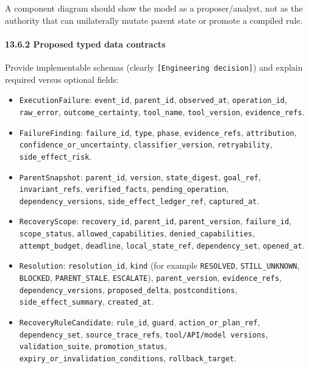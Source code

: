 A component diagram should show the model as a proposer/analyst, not as the authority that can unilaterally mutate parent state or promote a compiled rule.

\paragraph{13.6.2 Proposed typed data contracts}\label{1362-proposed-typed-data-contracts}

Provide implementable schemas (clearly \texttt{{[}Engineering\ decision{]}}) and explain required versus optional fields:

\begin{itemize}
\tightlist
\item
  \texttt{ExecutionFailure}: \texttt{event\_id}, \texttt{parent\_id}, \texttt{observed\_at}, \texttt{operation\_id}, \texttt{raw\_error}, \texttt{outcome\_certainty}, \texttt{tool\_name}, \texttt{tool\_version}, \texttt{evidence\_refs}.
\item
  \texttt{FailureFinding}: \texttt{failure\_id}, \texttt{type}, \texttt{phase}, \texttt{evidence\_refs}, \texttt{attribution}, \texttt{confidence\_or\_uncertainty}, \texttt{classifier\_version}, \texttt{retryability}, \texttt{side\_effect\_risk}.
\item
  \texttt{ParentSnapshot}: \texttt{parent\_id}, \texttt{version}, \texttt{state\_digest}, \texttt{goal\_ref}, \texttt{invariant\_refs}, \texttt{verified\_facts}, \texttt{pending\_operation}, \texttt{dependency\_versions}, \texttt{side\_effect\_ledger\_ref}, \texttt{captured\_at}.
\item
  \texttt{RecoveryScope}: \texttt{recovery\_id}, \texttt{parent\_id}, \texttt{parent\_version}, \texttt{failure\_id}, \texttt{scope\_status}, \texttt{allowed\_capabilities}, \texttt{denied\_capabilities}, \texttt{attempt\_budget}, \texttt{deadline}, \texttt{local\_state\_ref}, \texttt{dependency\_set}, \texttt{opened\_at}.
\item
  \texttt{Resolution}: \texttt{resolution\_id}, \texttt{kind} (for example \texttt{RESOLVED}, \texttt{STILL\_UNKNOWN}, \texttt{BLOCKED}, \texttt{PARENT\_STALE}, \texttt{ESCALATE}), \texttt{parent\_version}, \texttt{evidence\_refs}, \texttt{dependency\_versions}, \texttt{proposed\_delta}, \texttt{postconditions}, \texttt{side\_effect\_summary}, \texttt{created\_at}.
\item
  \texttt{RecoveryRuleCandidate}: \texttt{rule\_id}, \texttt{guard}, \texttt{action\_or\_plan\_ref}, \texttt{dependency\_set}, \texttt{source\_trace\_refs}, \texttt{tool/API/model\ versions}, \texttt{validation\_suite}, \texttt{promotion\_status}, \texttt{expiry\_or\_invalidation\_conditions}, \texttt{rollback\_target}.
\end{itemize}

